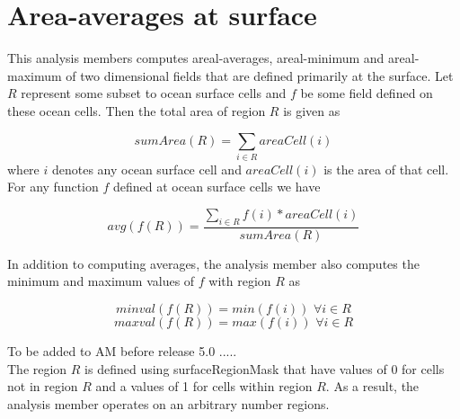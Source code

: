 \section{Area-averages at surface}
\label{sec:global_statistics}

This analysis members computes areal-averages, areal-minimum and areal-maximum of two dimensional fields that are defined primarily at the surface. Let $R$ represent some subset to ocean surface cells and $f$ be some field defined on these ocean cells. Then the total area of region $R$ is given as

\begin{equation}
sumArea(R) = \sum_{i \in R} areaCell(i)
\end{equation}
where $i$ denotes any ocean surface cell and $areaCell(i)$ is the area of that cell. For any function $f$ defined at ocean surface cells we have

\begin{equation}
avg(f(R)) = \frac{\sum_{i \in R} f(i)*areaCell(i)}{sumArea(R)}
\end{equation}

In addition to computing averages, the analysis member also computes the minimum and maximum values of $f$ with region $R$ as

\begin{equation}
minval(f(R))=min(f(i)) \, \, \forall i \in R
\end{equation}
\begin{equation}
maxval(f(R))=max(f(i)) \, \, \forall i \in R
\end{equation}

{\noindent}To be added to AM before release 5.0 .....\\
The region $R$ is defined using surfaceRegionMask that have values of 0 for cells not in region $R$ and a values of 1 for cells within region $R$. As a result, the analysis member operates on an arbitrary number regions.